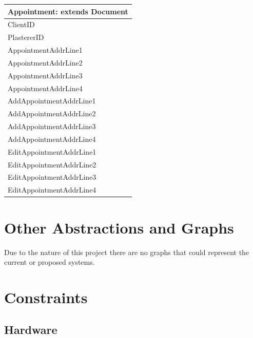 \begin{tabular}{|p{5cm}|}
	\hline
	\textbf{Appointment:} extends \textbf{Document} \\ \hline
		ClientID \\
		PlastererID \\
		AppointmentAddrLine1 \\
		AppointmentAddrLine2 \\
		AppointmentAddrLine3 \\
		AppointmentAddrLine4 \\ \hline
		AddAppointmentAddrLine1 \\
		AddAppointmentAddrLine2 \\
		AddAppointmentAddrLine3 \\
		AddAppointmentAddrLine4 \\
		EditAppointmentAddrLine1 \\
		EditAppointmentAddrLine2 \\
		EditAppointmentAddrLine3 \\
		EditAppointmentAddrLine4 \\ \hline

\end{tabular}




\section{Other Abstractions and Graphs}

\begin{flushleft}
Due to the nature of this project there are no graphs that could represent the current or proposed systems.

\end{flushleft}

\section{Constraints}

\subsection{Hardware}

